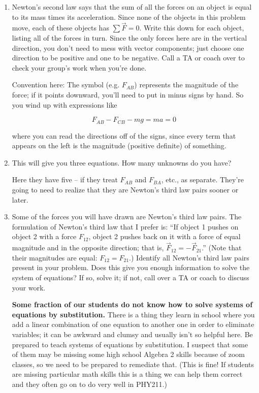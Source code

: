 \documentclass[12pt]{article}
\newcommand{\vsi}{\vspace{0.1in}}
\begin{document}
\begin{enumerate}
\item Newton's second law says that the sum of all the forces on an object is equal to its mass times its acceleration. Since none of the objects in this problem move, each of these objects has $\sum \vec F = 0$. Write this down
for each object, listing all of the forces in turn. Since the only forces here are in the vertical direction, you don't need to mess with vector components; just choose one direction to be positive and one to be negative. Call a 
TA or coach over to check your group's work when you're done.

{\color{Red} Convention here: The symbol (e.g. $F_{AB}$) represents the magnitude of the force; if it points downward, you'll need to put in minus signs by hand. So you wind up with expressions like 
	
	$$F_{AB} - F_{CB} - mg = ma = 0$$
	
	where you can read the directions off of the signs, since every term that appears on the left is the magnitude (positive definite) of something.
}	
	\vsi\vsi



\item This will give you three equations. How many unknowns do you have? 

{\color{Red}
Here they have five -- if they treat $F_{AB}$ and $F_{BA}$, etc., as separate. They're going to need to realize that they are Newton's third law pairs sooner or later.	
}

\vsi

\item Some of the forces you will have drawn are Newton's third law pairs. The formulation of Newton's third law that I prefer is: ``If object 1 pushes on object 2 with a force $F_{12}$, object 2 pushes back on it with a force of 
equal magnitude and in the opposite direction; that is, $\vec F_{12} = - \vec F_{21}$.'' (Note that their magnitudes are equal: $F_{12}=F_{21}$.)  
Identify all Newton's third law pairs present in your problem. Does this give you enough information to solve the system of equations? If so, solve it; if not, call over a TA or coach to discuss your work.

{\color{Red} {\bf Some fraction of our students do not know how to solve systems of equations by substitution.} There is a thing they learn in school where you add a linear combination of one equation to another one in order to eliminate variables; it can be awkward and clumsy and usually isn't so helpful here. Be prepared to teach systems of equations by substitution. I suspect that some of them may be missing some high school Algebra 2 skills because of zoom classes, so we need to be prepared to remediate that. (This is fine! If students are missing particular math skills this is a thing we can help them correct and they often go on to do very well in PHY211.)
	
}
\end{enumerate}
\end{document}
